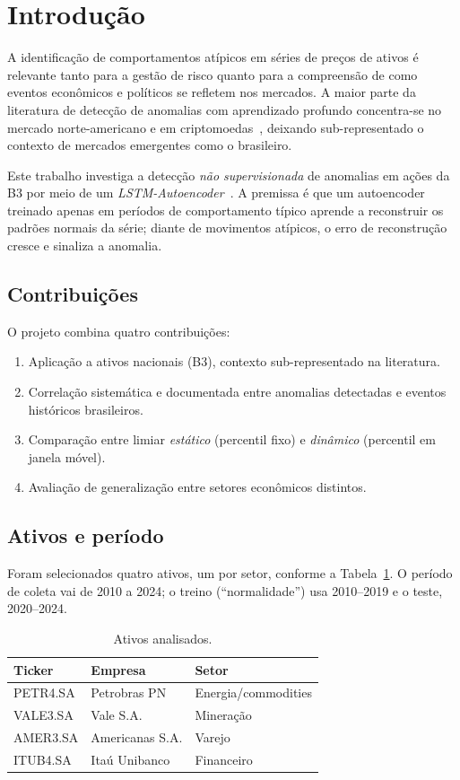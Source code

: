 \section{Introdução}

A identificação de comportamentos atípicos em séries de preços de ativos é relevante
tanto para a gestão de risco quanto para a compreensão de como eventos econômicos e
políticos se refletem nos mercados. A maior parte da literatura de detecção de anomalias
com aprendizado profundo concentra-se no mercado norte-americano e em
criptomoedas~\cite{li2020lstm,bitcoin2021anomaly}, deixando sub-representado o contexto
de mercados emergentes como o brasileiro.

Este trabalho investiga a detecção \emph{não supervisionada} de anomalias em ações da
B3 por meio de um \emph{LSTM-Autoencoder}~\cite{hochreiter1997lstm}. A premissa é que um
autoencoder treinado apenas em períodos de comportamento típico aprende a reconstruir os
padrões normais da série; diante de movimentos atípicos, o erro de reconstrução cresce e
sinaliza a anomalia.

\subsection{Contribuições}
O projeto combina quatro contribuições:
\begin{enumerate}[noitemsep]
  \item Aplicação a ativos nacionais (B3), contexto sub-representado na literatura.
  \item Correlação sistemática e documentada entre anomalias detectadas e eventos
        históricos brasileiros.
  \item Comparação entre limiar \emph{estático} (percentil fixo) e \emph{dinâmico}
        (percentil em janela móvel).
  \item Avaliação de generalização entre setores econômicos distintos.
\end{enumerate}

\subsection{Ativos e período}
Foram selecionados quatro ativos, um por setor, conforme a Tabela~\ref{tab:ativos}.
O período de coleta vai de 2010 a 2024; o treino (``normalidade'') usa 2010--2019 e o
teste, 2020--2024.

\begin{table}[h]
\centering
\caption{Ativos analisados.}
\label{tab:ativos}
\begin{tabular}{lll}
\toprule
\textbf{Ticker} & \textbf{Empresa} & \textbf{Setor} \\
\midrule
PETR4.SA & Petrobras PN    & Energia/commodities \\
VALE3.SA & Vale S.A.       & Mineração \\
AMER3.SA & Americanas S.A. & Varejo \\
ITUB4.SA & Itaú Unibanco   & Financeiro \\
\bottomrule
\end{tabular}
\end{table}

